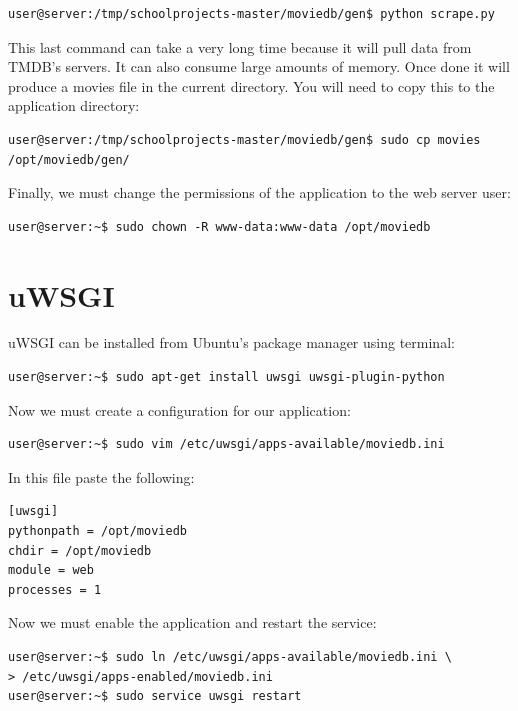 \documentclass[10pt,a4paper]{scrreprt}
\begin{document}
\begin{verbatim}
user@server:/tmp/schoolprojects-master/moviedb/gen$ python scrape.py
\end{verbatim}

This last command can take a very long time because it will pull data from TMDB's servers. It can also consume large amounts of memory. Once done it will produce a movies file in the current directory. You will need to copy this to the application directory:

\begin{verbatim}
user@server:/tmp/schoolprojects-master/moviedb/gen$ sudo cp movies /opt/moviedb/gen/
\end{verbatim}

Finally, we must change the permissions of the application to the web server user:

\begin{verbatim}
user@server:~$ sudo chown -R www-data:www-data /opt/moviedb
\end{verbatim}

\section{uWSGI}
uWSGI can be installed from Ubuntu's package manager using terminal:
\begin{verbatim}
user@server:~$ sudo apt-get install uwsgi uwsgi-plugin-python
\end{verbatim}

Now we must create a configuration for our application:

\begin{verbatim}
user@server:~$ sudo vim /etc/uwsgi/apps-available/moviedb.ini
\end{verbatim}

In this file paste the following:

\begin{verbatim}
[uwsgi]
pythonpath = /opt/moviedb
chdir = /opt/moviedb
module = web                                                                    
processes = 1 
\end{verbatim}

Now we must enable the application and restart the service:

\begin{verbatim}
user@server:~$ sudo ln /etc/uwsgi/apps-available/moviedb.ini \
> /etc/uwsgi/apps-enabled/moviedb.ini
user@server:~$ sudo service uwsgi restart
\end{verbatim}
\end{document}
